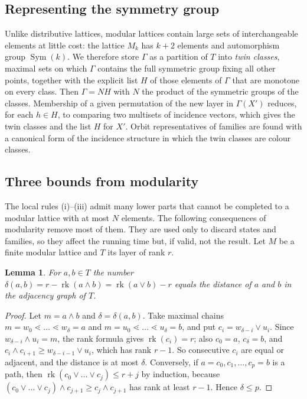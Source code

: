 \documentclass[11pt]{amsart}
\newtheorem{lemma}[theorem]{Lemma}
\theoremstyle{definition}
\theoremstyle{remark}
\newcommand{\rk}{\operatorname{rk}}
\newcommand{\Sym}{\operatorname{Sym}}
\begin{document}
\subsection{Representing the symmetry group}
Unlike distributive lattices, modular lattices contain large sets of interchangeable
elements at little cost: the lattice $M_k$ has $k+2$ elements and automorphism group
$\Sym(k)$.  We therefore store $\Gamma$ as a partition of $T$ into \emph{twin classes},
maximal sets on which $\Gamma$ contains the full symmetric group fixing all other points,
together with the explicit list $H$ of those elements of $\Gamma$ that are monotone on
every class.  Then $\Gamma = N H$ with $N$ the product of the symmetric groups of the
classes.  Membership of a given permutation of the new layer in $\Gamma(X')$ reduces, for each $h \in H$, to
comparing two multisets of incidence vectors, which gives the twin classes and the list
$H$ for $X'$.  Orbit representatives of families are found with a canonical form of the incidence
structure in which the twin classes are colour classes.

\subsection{Three bounds from modularity}
The local rules (i)--(iii) admit many lower parts that cannot be completed to a
modular lattice with at most $N$ elements.  The following consequences of modularity
remove most of them.  They are used only to discard states and families, so they affect
the running time but, if valid, not the result.  Let $M$ be a finite modular lattice and
$T$ its layer of rank $r$.

\begin{lemma}\label{lem:dist}
For $a,b \in T$ the number $\delta(a,b) = r - \rk(a \wedge b) = \rk(a \vee b) - r$ equals
the distance of $a$ and $b$ in the adjacency graph of $T$.
\end{lemma}

\begin{proof}
Let $m = a \wedge b$ and $\delta = \delta(a,b)$.  Take maximal chains
$m = w_0 \lessdot \dots \lessdot w_\delta = a$ and $m = u_0 \lessdot \dots \lessdot u_\delta = b$, and
put $c_i = w_{\delta-i} \vee u_i$.  Since $w_{\delta-i} \wedge u_i = m$, the rank formula gives
$\rk(c_i) = r$; also $c_0 = a$, $c_\delta = b$, and
$c_i \wedge c_{i+1} \ge w_{\delta-i-1} \vee u_i$, which has rank $r-1$.  So
consecutive $c_i$ are equal or adjacent, and the distance is at most $\delta$.
Conversely, if $a = c_0, c_1, \dots, c_p = b$ is a path, then
$\rk(c_0 \vee \dots \vee c_{j}) \le r + j$ by induction, because
$(c_0 \vee \dots \vee c_j) \wedge c_{j+1} \ge c_j \wedge c_{j+1}$ has rank at least $r-1$.
Hence $\delta \le p$.
\end{proof}
\end{document}
